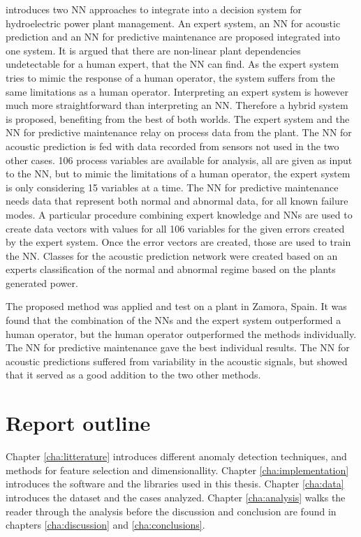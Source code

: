         \cite{Molina2000} introduces two NN approaches to integrate into a decision system for hydroelectric power plant management. An expert system, an NN for acoustic prediction and an NN for predictive maintenance are proposed integrated into one system. It is argued that there are non-linear plant dependencies undetectable for a human expert, that the NN can find. As the expert system tries to mimic the response of a human operator, the system suffers from the same limitations as a human operator. Interpreting an expert system is however much more straightforward than interpreting an NN. Therefore a hybrid system is proposed, benefiting from the best of both worlds. The expert system and the NN for predictive maintenance relay on process data from the plant. The NN for acoustic prediction is fed with data recorded from sensors not used in the two other cases. 106 process variables are available for analysis, all are given as input to the NN, but to mimic the limitations of a human operator, the expert system is only considering 15 variables at a time. The NN for predictive maintenance needs data that represent both normal and abnormal data, for all known failure modes. A particular procedure combining expert knowledge and NNs are used to create data vectors with values for all 106 variables for the given errors created by the expert system. Once the error vectors are created, those are used to train the NN. Classes for the acoustic prediction network were created based on an experts classification of the normal and abnormal regime based on the plants generated power. 
        
        The proposed method was applied and test on a plant in Zamora, Spain. It was found that the combination of the NNs and the expert system outperformed a human operator, but the human operator outperformed the methods individually. The NN for predictive maintenance gave the best individual results. The NN for acoustic predictions suffered from variability in the acoustic signals, but showed that it served as a good addition to the two other methods. 
        
        
    
    
    
    \section{Report outline}
    Chapter \ref{cha:litterature} introduces different anomaly detection techniques, and methods for feature selection and dimensionallity. Chapter \ref{cha:implementation} introduces the software and the libraries used in this thesis. Chapter \ref{cha:data} introduces the dataset and the cases analyzed. Chapter \ref{cha:analysis} walks the reader through the analysis before the discussion and conclusion are found in chapters  \ref{cha:discussion} and \ref{cha:conclusions}.  


